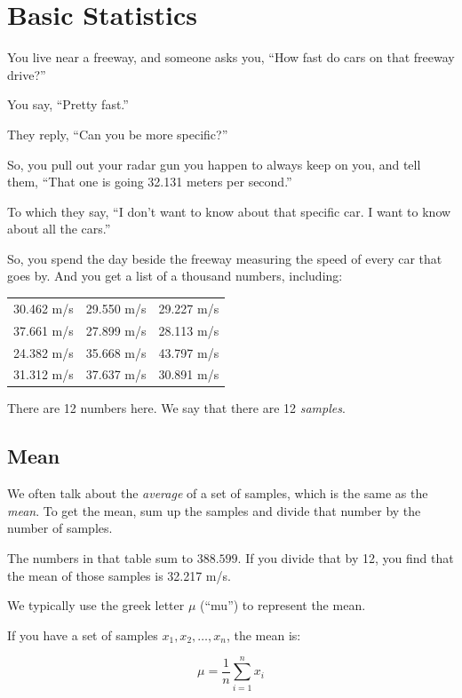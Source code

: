 \chapter{Basic Statistics}

You live near a freeway, and someone asks you, ``How fast do cars on that freeway drive?''

You say, ``Pretty fast.''

They reply, ``Can you be more specific?''

So, you pull out your radar gun you happen to always keep on you, and tell them, ``That one is going 32.131 meters per second.''

To which they say, ``I don't want to know about that specific car. I want to know about all the cars.''

So, you spend the day beside the freeway measuring the speed of every
car that goes by. And you get a list of a thousand numbers, including:

\begin{tabular}{c | c | c}
30.462 m/s  & 29.550 m/s & 29.227 m/s \\
37.661 m/s  & 27.899 m/s & 28.113 m/s \\
24.382 m/s & 35.668 m/s & 43.797 m/s \\
31.312 m/s & 37.637 m/s & 30.891 m/s
\end {tabular}

There are 12 numbers here. We say that there are 12 \textit{samples}.

\section{Mean}

We often talk about the \textit{average} of a set of samples, which is the 
same as the \textit{mean}. To get the mean, sum up the
samples and divide that number by the number of samples.

The numbers in that table sum to $388.599$.  If you divide that by 12,
you find that the mean of those samples is 32.217 m/s.

We typically use the greek letter $\mu$ (``mu'') to represent the mean.

\begin{mdframed}[style=important, frametitle={Definition of Mean}]
  
If you have a set of samples $x_1, x_2, \ldots, x_n$, the mean is:

$$ \mu = \frac{1}{n} \sum_{i=1}^n x_i$$

\end{mdframed}

